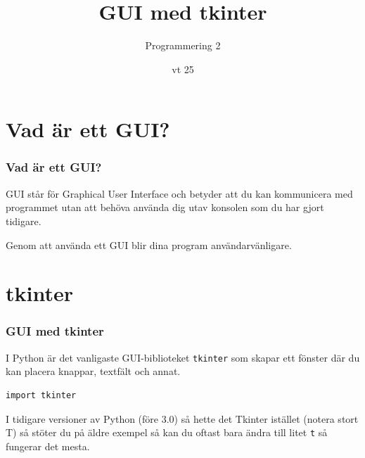 \documentclass[aspectratio=169]{beamer}
\begin{document}



\title{GUI med tkinter}
\date{vt 25}
\author{Programmering 2}

\maketitle

\section{Vad är ett GUI?}

\begin{frame}
\frametitle{Vad är ett GUI?}

GUI står för Graphical User Interface och betyder att du kan kommunicera med programmet utan att behöva använda dig utav konsolen som du har gjort tidigare.

Genom att använda ett GUI blir dina program användarvänligare.

\end{frame}

\section{tkinter}

\begin{frame}[fragile]
\frametitle{GUI med tkinter}

I Python är det vanligaste GUI-biblioteket \texttt{tkinter} som skapar ett fönster där du kan placera knappar, textfält och annat.

\begin{lstlisting}
import tkinter
\end{lstlisting}

\pause

I tidigare versioner av Python (före 3.0) så hette det Tkinter istället (notera stort T) så stöter du på äldre exempel så kan du oftast bara ändra till litet \texttt{t} så fungerar det mesta.

\end{frame}
\end{document}
